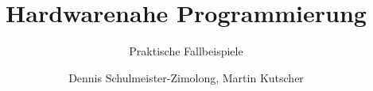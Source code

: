 \title{Hardwarenahe Programmierung}
\subtitle{Praktische Fallbeispiele}
\author{Dennis Schulmeister-Zimolong, Martin Kutscher}

\renewcommand{\ubInstitute}{Studiengang Wirtschaftsinformatik}
\renewcommand{\ubModule}{IoT -- Technical Point of View}
\renewcommand{\ubType}{Aufgaben}
